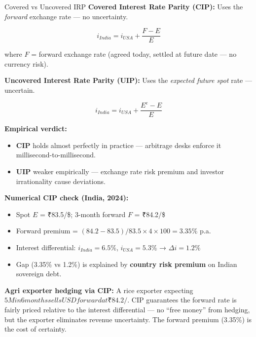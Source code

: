 \documentclass[
  ignorenonframetext,
  aspectratio=169,
]{beamer}
\makeatletter
\providecommand{\tightlist}{%
  \setlength{\itemsep}{0pt}\setlength{\parskip}{0pt}}
\let\quarto@originallabel\label
\DeclareRobustCommand*{\label}[1]{\quarto@originallabel{#1}}
\makeatother
\begin{document}
\begin{frame}{Covered vs Uncovered IRP}
\label{covered-vs-uncovered-irp}
\textbf{Covered Interest Rate Parity (CIP):} Uses the \emph{forward}
exchange rate --- no uncertainty.

\[i_{India} = i_{USA} + \frac{F - E}{E}\]

where \(F\) = forward exchange rate (agreed today, settled at future
date --- no currency risk).

\textbf{Uncovered Interest Rate Parity (UIP):} Uses the \emph{expected
future spot} rate --- uncertain.

\[i_{India} = i_{USA} + \frac{E^e - E}{E}\]

\textbf{Empirical verdict:}

\begin{itemize}
\tightlist
\item
  \textbf{CIP} holds almost perfectly in practice --- arbitrage desks
  enforce it millisecond-to-millisecond.
\item
  \textbf{UIP} weaker empirically --- exchange rate risk premium and
  investor irrationality cause deviations.
\end{itemize}

\textbf{Numerical CIP check (India, 2024):}

\begin{itemize}
\tightlist
\item
  Spot \(E\) = ₹83.5/\$; 3-month forward \(F\) = ₹84.2/\$
\item
  Forward premium = \((84.2-83.5)/83.5 \times 4 \times 100 = 3.35\%\)
  p.a.
\item
  Interest differential: \(i_{India}=6.5\%\), \(i_{USA}=5.3\%\) →
  \(\Delta i = 1.2\%\)
\item
  Gap (3.35\% vs 1.2\%) is explained by \textbf{country risk premium} on
  Indian sovereign debt.
\end{itemize}

\textbf{Agri exporter hedging via CIP:} A rice exporter expecting
\(5M in 6 months sells USD forward at ₹84.2/\). CIP guarantees the
forward rate is fairly priced relative to the interest differential ---
no ``free money'' from hedging, but the exporter eliminates revenue
uncertainty. The forward premium (3.35\%) is the cost of certainty.
\end{frame}
\end{document}
